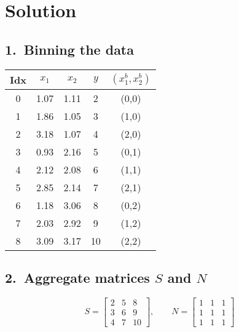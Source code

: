 \documentclass{article}
\begin{document}
\section*{Solution}

\subsection*{1.~Binning the data}

\begin{center}
\begin{tabular}{ccccc}
\toprule
Idx & $x_1$ & $x_2$ & $y$ & $(x_1^b,x_2^b)$\\ \midrule
0 & 1.07 & 1.11 &  2 & (0,0)\\
1 & 1.86 & 1.05 &  3 & (1,0)\\
2 & 3.18 & 1.07 &  4 & (2,0)\\
3 & 0.93 & 2.16 &  5 & (0,1)\\
4 & 2.12 & 2.08 &  6 & (1,1)\\
5 & 2.85 & 2.14 &  7 & (2,1)\\
6 & 1.18 & 3.06 &  8 & (0,2)\\
7 & 2.03 & 2.92 &  9 & (1,2)\\
8 & 3.09 & 3.17 & 10 & (2,2)\\ \bottomrule
\end{tabular}

\end{center}

\subsection*{2.~Aggregate matrices \(S\) and \(N\)}
\[
  S=\begin{bmatrix}
        2 & 5 & 8\\
        3 & 6 & 9\\
        4 & 7 & 10
     \end{bmatrix},
\qquad
  N=\begin{bmatrix}
        1&1&1\\
        1&1&1\\
        1&1&1
     \end{bmatrix}
\]
\end{document}
